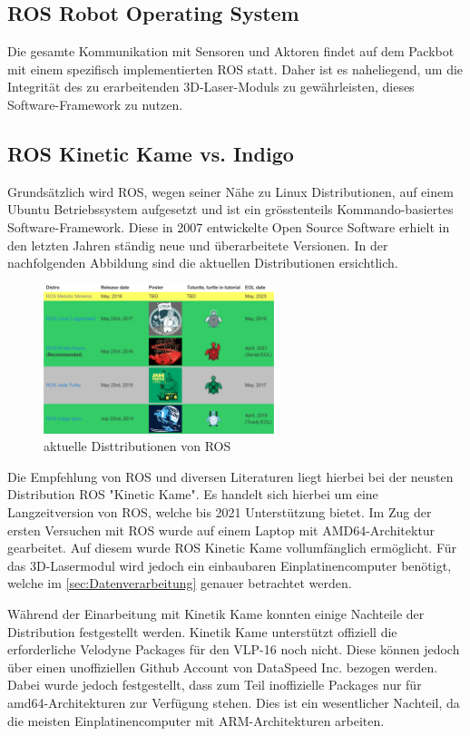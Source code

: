 \subsection{ROS Robot Operating System}
\label{subsec:ROS}
Die gesamte Kommunikation mit Sensoren und Aktoren findet auf dem Packbot mit einem spezifisch implementierten \ac{ROS} statt. Daher ist es naheliegend, um die Integrität des zu erarbeitenden 3D-Laser-Moduls zu gewährleisten, dieses Software-Framework zu nutzen.  

\subsection{ROS Kinetic Kame vs. Indigo}
\label{subsec:OS_versus} 
Grundsätzlich wird \ac{ROS}, wegen seiner Nähe zu Linux Distributionen, auf einem Ubuntu Betriebssystem aufgesetzt und ist ein grösstenteils Kommando-basiertes Software-Framework. Diese in 2007 entwickelte Open Source Software erhielt in den letzten Jahren ständig neue und überarbeitete Versionen. In der nachfolgenden Abbildung sind die aktuellen Distributionen ersichtlich.

\begin{figure}[H]
	\centering
	\includegraphics[width=0.6\textwidth]{resources/rosdistos.PNG}
	\caption[aktuelle Distributionen von ROS]{aktuelle Disttributionen von ROS {\cite{ROSprojects}}}
	\label{fig:rosdistros}
\end{figure} 

Die Empfehlung von ROS und diversen Literaturen liegt hierbei bei der neusten Distribution ROS "Kinetic Kame". Es handelt sich hierbei um eine Langzeitversion von ROS, welche bis 2021 Unterstützung bietet. Im Zug der ersten Versuchen mit ROS wurde auf einem Laptop mit AMD64-Architektur gearbeitet. Auf diesem wurde ROS Kinetic Kame vollumfänglich ermöglicht. Für das 3D-Lasermodul wird jedoch ein einbaubaren Einplatinencomputer benötigt, welche im \ref{sec:Datenverarbeitung} genauer betrachtet werden. 

Während der Einarbeitung mit Kinetik Kame konnten einige Nachteile der Distribution festgestellt werden. Kinetik Kame unterstützt offiziell die erforderliche Velodyne Packages für den VLP-16 noch nicht. Diese können jedoch über einen unoffiziellen Github Account von DataSpeed Inc. bezogen werden. Dabei wurde jedoch festgestellt, dass zum Teil inoffizielle Packages nur für amd64-Architekturen zur Verfügung stehen. Dies ist ein wesentlicher Nachteil, da die meisten Einplatinencomputer mit ARM-Architekturen arbeiten.

